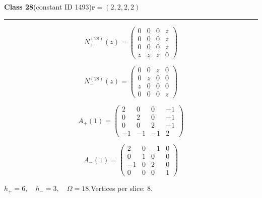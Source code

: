 \noindent\begin{minipage}{\linewidth}
\noindent\textbf{Class 28}\quad\small (constant ID 1493)\hfill $\symbf{r}=(2,2,2,2)$
\par\smallskip\noindent\textcolor{rulegray}{\rule{\linewidth}{0.3pt}}
\begin{minipage}[c]{0.495\linewidth}\centering\fontsize{9.7}{12}\selectfont
\setlength{\abovedisplayskip}{4pt}\setlength{\belowdisplayskip}{4pt}
\setlength{\abovedisplayshortskip}{4pt}\setlength{\belowdisplayshortskip}{4pt}
\setlength{\arraycolsep}{3pt}\renewcommand{\arraystretch}{1.08}
\[N_{+}^{(28)}(z)=\begin{pmatrix}0 & 0 & 0 & z\\0 & 0 & 0 & z\\0 & 0 & 0 & z\\z & z & z & 0\end{pmatrix}\]
\end{minipage}%
\begin{minipage}[c]{0.495\linewidth}\centering\fontsize{9.7}{12}\selectfont
\setlength{\abovedisplayskip}{4pt}\setlength{\belowdisplayskip}{4pt}
\setlength{\abovedisplayshortskip}{4pt}\setlength{\belowdisplayshortskip}{4pt}
\setlength{\arraycolsep}{3pt}\renewcommand{\arraystretch}{1.08}
\[N_{-}^{(28)}(z)=\begin{pmatrix}0 & 0 & z & 0\\0 & z & 0 & 0\\z & 0 & 0 & 0\\0 & 0 & 0 & z\end{pmatrix}\]
\end{minipage}%
\par\noindent
\begin{minipage}[c]{0.495\linewidth}\centering\fontsize{9.7}{12}\selectfont
\setlength{\abovedisplayskip}{4pt}\setlength{\belowdisplayskip}{4pt}
\setlength{\abovedisplayshortskip}{4pt}\setlength{\belowdisplayshortskip}{4pt}
\setlength{\arraycolsep}{3pt}\renewcommand{\arraystretch}{1.08}
\[A_{+}(1)=\begin{pmatrix}2 & 0 & 0 & -1\\0 & 2 & 0 & -1\\0 & 0 & 2 & -1\\-1 & -1 & -1 & 2\end{pmatrix}\]
\end{minipage}%
\begin{minipage}[c]{0.495\linewidth}\centering\fontsize{9.7}{12}\selectfont
\setlength{\abovedisplayskip}{4pt}\setlength{\belowdisplayskip}{4pt}
\setlength{\abovedisplayshortskip}{4pt}\setlength{\belowdisplayshortskip}{4pt}
\setlength{\arraycolsep}{3pt}\renewcommand{\arraystretch}{1.08}
\[A_{-}(1)=\begin{pmatrix}2 & 0 & -1 & 0\\0 & 1 & 0 & 0\\-1 & 0 & 2 & 0\\0 & 0 & 0 & 1\end{pmatrix}\]
\end{minipage}%
\par\smallskip\noindent\small $h_+=6,\quad h_-=3,\quad \Omega=18.$\quad Vertices per slice: 8.
\end{minipage}\par\vfill
